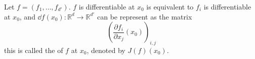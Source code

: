\begin{proposition}
	Let $f = (f_1,\dots, f_{d'})$.
	$f$ is differentiable at $x_0$ is equivalent to $f_i$ is differentiable at $x_0$,
	and $\dd f(x_0): \mathbb{R}^{d}\to \mathbb{R}^{d'}$ can be represent as the matrix
	\[
		\left(\frac{\partial f_i}{\partial x_j}(x_0)\right)_{i,j}
	\]
	this is called the  of $f$ at $x_0$, denoted by $J(f)(x_0)$.
\end{proposition}
